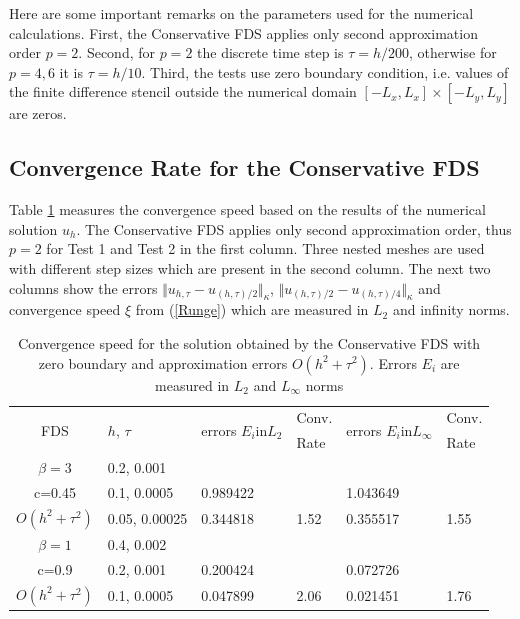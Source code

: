 \documentclass[%
 aip,
cp,  %
 amsmath,amssymb,%
 reprint,%
]{revtex4-2}
\newcommand{\rf}[1]{(\ref{#1})}
\begin{document}
Here are some important remarks on the parameters used for the numerical calculations. First, the Conservative FDS applies only second approximation order $p=2$. Second, for $p=2$ the discrete time step is $\tau=h/200$, otherwise for $p=4, 6$ it is $\tau = h/10$. Third, the tests use zero boundary condition, i.e. values of the finite difference stencil outside the numerical domain $[-L_x, L_x] \times [-L_y, L_y]$ are zeros.

\subsection{Convergence Rate for the Conservative FDS}

Table \ref{tableC} measures the convergence speed based on the results of the numerical solution $u_h$. The Conservative FDS applies only second approximation order, thus $p=2$ for Test 1 and Test 2 in the first column. Three nested meshes are used with different step sizes which are present in the second column. The next two columns show the errors $\Vert u_{h,\tau} - u_{(h,\tau)/2} \Vert_\kappa$, $\Vert  u_{(h,\tau)/2} - u_{(h,\tau)/4} \Vert_\kappa$ and convergence speed $\xi$ from \rf{Runge} which are measured in $L_2$ and infinity norms. 
\begin{table}[ht]
\centering
\small
		\begin{tabular}{||c|l|ll|ll||}
			\hline
			\hline
      \multirow{2  }{*}{FDS}        & \multirow{2  }{*}{$h$, $\tau$}  & \multirow{2  }{*}{errors $E_i$in$L_2$}  &Conv.& \multirow{2  }{*}{errors $E_i$in$L_\infty$}  &Conv.  \\
	                                        &                                                     &                                                                 &  Rate &                                                                       & Rate \\
   			\hline 
					\hline 
  $\beta=3$                &0.2, 0.001         &                    &                &                  &                   \\
   c=0.45                     &0.1, 0.0005         & 0.989422   &                & 1.043649  &                   \\
     $O(h^2 + \tau^ 2)$ &0.05, 0.00025  &0.344818    & 1.52       & 0.355517   &   1.55   \\
	   \hline
			\hline 
       $\beta=1$           & 0.4, 0.002       &                   &           &                 &   \\
                  c=0.9       & 0.2, 0.001        & 0.200424   &          &0.072726  &   \\
  $O(h^2+ \tau^2)$  & 0.1, 0.0005       & 0.047899   & 2.06  &0.021451  & 1.76 \\
	   \hline
			\hline 
		\end{tabular}
		\caption{Convergence speed for the solution obtained by the Conservative FDS with zero boundary and approximation errors $O(h^{2} + \tau^2 )$. Errors $E_i$ are measured in $L_2$ and $L_\infty$ norms}
\label{tableC}
\end{table}
\end{document}
